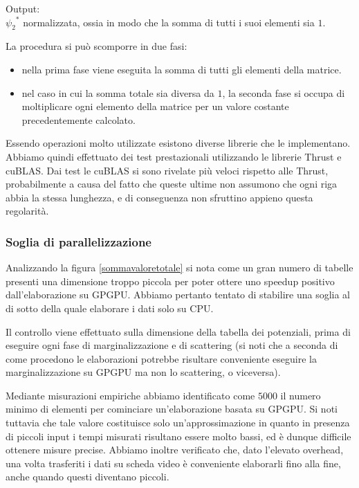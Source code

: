 \documentclass[a4paper]{article}   %
\begin{document}
Output:\\
${\psi_2}^{*}$ normalizzata, ossia in modo che la somma di tutti i suoi elementi sia $1$.

La procedura si può scomporre in due fasi:
\begin{itemize}
\item nella prima fase viene eseguita la somma di tutti gli elementi della matrice.
\item nel caso in cui la somma totale sia diversa da $1$, la seconda fase si occupa di moltiplicare ogni elemento della matrice per un valore costante precedentemente calcolato.
\end{itemize}
Essendo operazioni molto utilizzate esistono diverse librerie che le implementano. Abbiamo quindi effettuato dei test prestazionali utilizzando le librerie Thrust e cuBLAS.
Dai test le cuBLAS si sono rivelate più veloci rispetto alle Thrust, probabilmente a causa del fatto che queste ultime non assumono che ogni riga abbia la stessa lunghezza, e di conseguenza non sfruttino appieno questa regolarità.

\subsubsection{Soglia di parallelizzazione}\label{sogliaparallelizzazione}
Analizzando la figura \ref{sommavaloretotale} si nota come un gran numero di tabelle presenti una dimensione troppo piccola per poter ottere uno speedup positivo dall'elaborazione su GPGPU.
Abbiamo pertanto tentato di stabilire una soglia al di sotto della quale elaborare i dati solo su CPU. 

Il controllo viene effettuato sulla dimensione della tabella dei potenziali, prima di eseguire ogni fase di marginalizzazione e di scattering (si noti che a seconda di come procedono le elaborazioni potrebbe risultare conveniente eseguire la marginalizzazione su GPGPU ma non lo scattering, o viceversa).

Mediante misurazioni empiriche abbiamo identificato come $5000$ il numero minimo di elementi per cominciare un'elaborazione basata su GPGPU.
Si noti tuttavia che tale valore costituisce solo un'approssimazione in quanto in presenza di piccoli input i tempi misurati risultano essere molto bassi, ed è dunque difficile ottenere misure precise.
Abbiamo inoltre verificato che, dato l’elevato overhead, una volta trasferiti i dati su scheda video è conveniente elaborarli fino alla fine, anche quando questi diventano piccoli.
\end{document}
